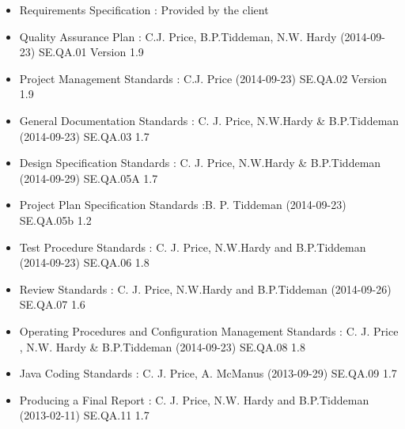 \begin{itemize}
	\item Requirements Specification : Provided by the client
	\item Quality Assurance Plan : C.J. Price, B.P.Tiddeman, N.W. Hardy (2014-09-23) SE.QA.01 Version 1.9
	\item Project Management Standards : C.J. Price (2014-09-23) SE.QA.02 Version 1.9
	\item General Documentation Standards : C. J. Price, N.W.Hardy \& B.P.Tiddeman (2014-09-23) SE.QA.03 1.7
	\item Design Specification Standards : C. J. Price, N.W.Hardy \& B.P.Tiddeman (2014-09-29) SE.QA.05A 1.7
	\item Project Plan Specification Standards :B. P. Tiddeman (2014-09-23) SE.QA.05b 1.2
	\item Test Procedure Standards : C. J. Price, N.W.Hardy and B.P.Tiddeman (2014-09-23) SE.QA.06 1.8
	\item Review Standards : C. J. Price, N.W.Hardy and B.P.Tiddeman (2014-09-26) SE.QA.07 1.6
	\item Operating Procedures and Configuration Management Standards : C. J. Price , N.W. Hardy \& B.P.Tiddeman (2014-09-23) SE.QA.08 1.8
	\item Java Coding Standards : C. J. Price, A. McManus (2013-09-29) SE.QA.09 1.7
	\item Producing a Final Report : C. J. Price, N.W. Hardy and B.P.Tiddeman (2013-02-11) SE.QA.11 1.7
\end{itemize}
